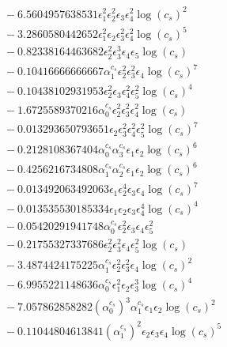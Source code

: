 \documentclass[10pt]{article}
\begin{document}
\begin{align*}
&{}  - 6.5604957638531 \epsilon_{1}^{2} \epsilon_{2}^{2} \epsilon_{3} \epsilon_{4}^{2} \log{\left(c_{s} \right)}^{2} \\
&{}  - 3.2860580442652 \epsilon_{1}^{2} \epsilon_{2} \epsilon_{3}^{2} \epsilon_{4}^{2} \log{\left(c_{s} \right)}^{5} \\
&{}  - 0.82338164463682 \epsilon_{2}^{2} \epsilon_{3}^{3} \epsilon_{4} \epsilon_{5} \log{\left(c_{s} \right)} \\
&{}  - 0.10416666666667 \alpha_{1}^{c_s} \epsilon_{2}^{2} \epsilon_{3}^{2} \epsilon_{4} \log{\left(c_{s} \right)}^{7} \\
&{}  - 0.10438102931953 \epsilon_{2}^{2} \epsilon_{3} \epsilon_{4}^{2} \epsilon_{5}^{2} \log{\left(c_{s} \right)}^{4} \\
&{}  - 1.6725589370216 \alpha_{0}^{c_s} \epsilon_{2}^{2} \epsilon_{3}^{2} \epsilon_{4}^{2} \log{\left(c_{s} \right)} \\
&{}  - 0.013293650793651 \epsilon_{2} \epsilon_{3}^{2} \epsilon_{4}^{2} \epsilon_{5}^{2} \log{\left(c_{s} \right)}^{7} \\
&{}  - 0.2128108367404 \alpha_{0}^{c_s} \alpha_{3}^{c_s} \epsilon_{1} \epsilon_{2} \log{\left(c_{s} \right)}^{6} \\
&{}  - 0.4256216734808 \alpha_{1}^{c_s} \alpha_{2}^{c_s} \epsilon_{1} \epsilon_{2} \log{\left(c_{s} \right)}^{6} \\
&{}  - 0.013492063492063 \epsilon_{1} \epsilon_{2}^{4} \epsilon_{3} \epsilon_{4} \log{\left(c_{s} \right)}^{7} \\
&{}  - 0.013535530185334 \epsilon_{1} \epsilon_{2} \epsilon_{3} \epsilon_{4}^{4} \log{\left(c_{s} \right)}^{4} \\
&{}  - 0.05420291941748 \alpha_{0}^{c_s} \epsilon_{2}^{2} \epsilon_{3} \epsilon_{4} \epsilon_{5}^{2} \\
&{}  - 0.21755327337686 \epsilon_{2}^{2} \epsilon_{3}^{2} \epsilon_{4} \epsilon_{5}^{2} \log{\left(c_{s} \right)} \\
&{}  - 3.4874424175225 \alpha_{1}^{c_s} \epsilon_{2}^{2} \epsilon_{3}^{2} \epsilon_{4} \log{\left(c_{s} \right)}^{2} \\
&{}  - 6.9955221148636 \alpha_{0}^{c_s} \epsilon_{1}^{2} \epsilon_{2} \epsilon_{3}^{3} \log{\left(c_{s} \right)}^{4} \\
&{}  - 7.057862858282 \left(\alpha_{0}^{c_s}\right)^{3} \alpha_{1}^{c_s} \epsilon_{1} \epsilon_{2} \log{\left(c_{s} \right)}^{2} \\
&{}  - 0.11044804613841 \left(\alpha_{1}^{c_s}\right)^{2} \epsilon_{2} \epsilon_{3} \epsilon_{4} \log{\left(c_{s} \right)}^{5} \\

\end{align*}
\end{document}
